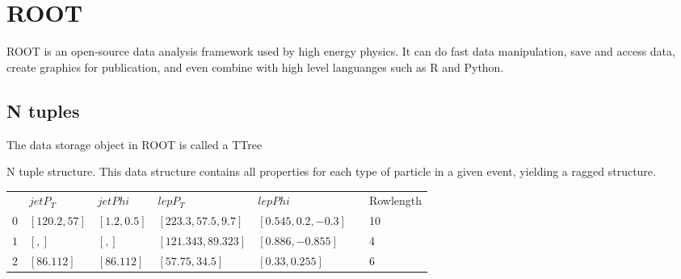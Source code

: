 \section{ROOT}
ROOT is an open-source data analysis framework used by high energy physics. It can do fast data manipulation, save and access data, 
create graphics for publication, and even combine with high level languanges such as R and Python.
\subsection*{N tuples}

The data storage object in ROOT is called a TTree


N tuple structure. This data structure contains all properties for each type of particle in a given event, yielding
a ragged structure. 

\begin{table}[H]
    \begin{tabular}{|l|l|l|l|l|l|l|}
    \cline{1-5} \cline{7-7}
        & $jetP_T$      & $jetPhi$     & $lepP_T$             & $lepPhi$             &  & Rowlength \\ \cline{1-5} \cline{7-7} 
    $0$ & $[120.2, 57]$ & $[1.2, 0.5]$ & $[223.3, 57.5, 9.7]$ & $[0.545, 0.2, -0.3]$ &  & 10        \\ \cline{1-5} \cline{7-7} 
    $1$ & $[, ]$          & $[, ]$         & $[121.343, 89.323]$  & $[0.886, -0.855]$    &  & 4         \\ \cline{1-5} \cline{7-7} 
    $2$ & $[86.112]$    & $[86.112]$   & $[57.75, 34.5]$      & $[0.33, 0.255]$      &  & 6         \\ \cline{1-5} \cline{7-7} 
    \end{tabular}
\end{table}


